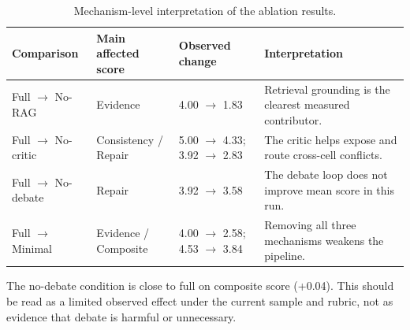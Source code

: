 \begin{table}[htbp]
\centering
\begin{threeparttable}
\caption{Mechanism-level interpretation of the ablation results.}
\label{tab:ablation-mechanism-reading}
\begin{tabular}{llll}
\toprule
Comparison & Main affected score & Observed change & Interpretation \\
\midrule
Full $\rightarrow$ No-RAG & Evidence & 4.00 $\rightarrow$ 1.83 & Retrieval grounding is the clearest measured contributor. \\
Full $\rightarrow$ No-critic & Consistency / Repair & 5.00 $\rightarrow$ 4.33; 3.92 $\rightarrow$ 2.83 & The critic helps expose and route cross-cell conflicts. \\
Full $\rightarrow$ No-debate & Repair & 3.92 $\rightarrow$ 3.58 & The debate loop does not improve mean score in this run. \\
Full $\rightarrow$ Minimal & Evidence / Composite & 4.00 $\rightarrow$ 2.58; 4.53 $\rightarrow$ 3.84 & Removing all three mechanisms weakens the pipeline. \\
\bottomrule
\end{tabular}
\begin{tablenotes}
\small
\item The no-debate condition is close to full on composite score (+0.04). This should be read as a limited observed effect under the current sample and rubric, not as evidence that debate is harmful or unnecessary.
\end{tablenotes}
\end{threeparttable}
\end{table}

